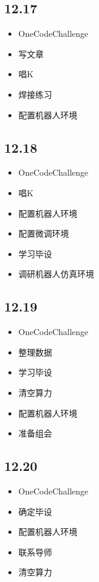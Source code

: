 \documentclass[UTF8]{ctexart}
\begin{document}
\subsection*{12.17}
\begin{itemize}
    \item OneCodeChallenge
    \item 写文章
    \item 唱K
    \item 焊接练习
    \item 配置机器人环境
\end{itemize}

\subsection*{12.18}
\begin{itemize}
    \item OneCodeChallenge
    \item 唱K
    \item 配置机器人环境
    \item 配置微调环境
    \item 学习毕设
    \item 调研机器人仿真环境
\end{itemize}

\subsection*{12.19}
\begin{itemize}
    \item OneCodeChallenge
    \item 整理数据
    \item 学习毕设
    \item 清空算力
    \item 配置机器人环境
    \item 准备组会
\end{itemize}

\subsection*{12.20}
\begin{itemize}
    \item OneCodeChallenge
    \item 确定毕设
    \item 配置机器人环境
    \item 联系导师
    \item 清空算力
\end{itemize}
\end{document}
